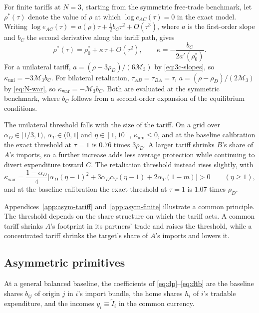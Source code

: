 \documentclass[11pt]{article}
\begin{document}
For finite tariffs at $N=3$, starting from the symmetric free-trade benchmark, let $\rho^\ast(\tau)$ denote the value of $\rho$ at which $\log e_{AC}(\tau)=0$ in the exact model. Writing $\log e_{AC}(\tau)=a(\rho)\tau+\tfrac12 b_C\tau^2+O(\tau^3)$, where $a$ is the first-order slope and $b_C$ the second derivative along the tariff path, gives
\[
\rho^\ast(\tau)=\rho^\ast_0+\kappa\,\tau+O(\tau^2),
\qquad
\kappa=-\frac{b_C}{2a'(\rho^\ast_0)}.
\]
For a unilateral tariff, $a=(\rho-3\rho_D)/(6\mathcal M_3)$ by \eqref{eq:3c-slopes}, so $\kappa_{\mathrm{uni}}=-3\mathcal M_3 b_C$. For bilateral retaliation, $\tau_{AB}=\tau_{BA}=\tau$, $a=(\rho-\rho_D)/(2\mathcal M_3)$ by \eqref{eq:N-war}, so $\kappa_{\mathrm{war}}=-\mathcal M_3 b_C$. Both are evaluated at the symmetric benchmark, where $b_C$ follows from a second-order expansion of the equilibrium conditions.

The unilateral threshold falls with the size of the tariff. On a grid over $\alpha_D\in[1/3,1)$, $\alpha_T\in(0,1]$ and $\eta\in[1,10]$, $\kappa_{\mathrm{uni}}\leq0$, and at the baseline calibration the exact threshold at $\tau=1$ is $0.76$ times $3\rho_D$. A larger tariff shrinks $B$'s share of $A$'s imports, so a further increase adds less average protection while continuing to divert expenditure toward $C$. The retaliation threshold instead rises slightly, with
\[
\kappa_{\mathrm{war}}=\frac{1-\alpha_D}{4}\Big[\alpha_D(\eta-1)^2+3\alpha_D\alpha_T(\eta-1)+2\alpha_T(1-m)\Big]>0
\qquad(\eta\geq1),
\]
and at the baseline calibration the exact threshold at $\tau=1$ is $1.07$ times $\rho_D$.

Appendices~\ref{app:asym-tariff} and~\ref{app:asym-finite} illustrate a common principle. The threshold depends on the share structure on which the tariff acts. A common tariff shrinks $A$'s footprint in its partners' trade and raises the threshold, while a concentrated tariff shrinks the target's share of $A$'s imports and lowers it.

\subsection{Asymmetric primitives}

At a general balanced baseline, the coefficients of \eqref{eq:dp}--\eqref{eq:dtb} are the baseline shares $b_{ij}$ of origin $j$ in $i$'s import bundle, the home shares $h_i$ of $i$'s tradable expenditure, and the incomes $y_i\equiv\widetilde I_i$ in the common currency.
\end{document}
